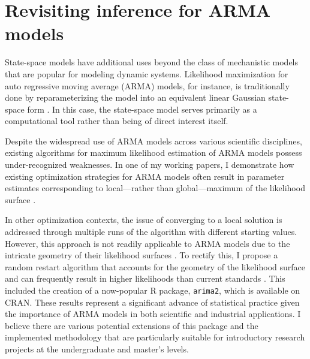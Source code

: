 \documentclass{article}
\begin{document}

\section{Revisiting inference for ARMA models}

State-space models have additional uses beyond the class of mechanistic models that are popular for modeling dynamic systems.
Likelihood maximization for auto regressive moving average (ARMA) models, for instance, is traditionally done by reparameterizing the model into an equivalent linear Gaussian state-space form \cite{gardner80, durbin12}.
In this case, the state-space model serves primarily as a computational tool rather than being of direct interest itself.

Despite the widespread use of ARMA models across various scientific disciplines, existing algorithms for maximum likelihood estimation of ARMA models possess under-recognized weaknesses.
In one of my working papers, I demonstrate how existing optimization strategies for ARMA models often result in parameter estimates corresponding to local---rather than global---maximum of the likelihood surface \cite{wheelerARMA}.

In other optimization contexts, the issue of converging to a local solution is addressed through multiple runs of the algorithm with different starting values.
However, this approach is not readily applicable to ARMA models due to the intricate geometry of their likelihood surfaces \cite{ripley2002}.
To rectify this, I propose a random restart algorithm that accounts for the geometry of the likelihood surface and can frequently result in higher likelihoods than current standards \cite{wheelerARMA}.
This included the creation of a now-popular R package, \texttt{arima2}, which is available on CRAN.
These results represent a significant advance of statistical practice given the importance of ARMA models in both scientific and industrial applications.
I believe there are various potential extensions of this package and the implemented methodology that are particularly suitable for introductory research projects at the undergraduate and master's levels.
\end{document}
